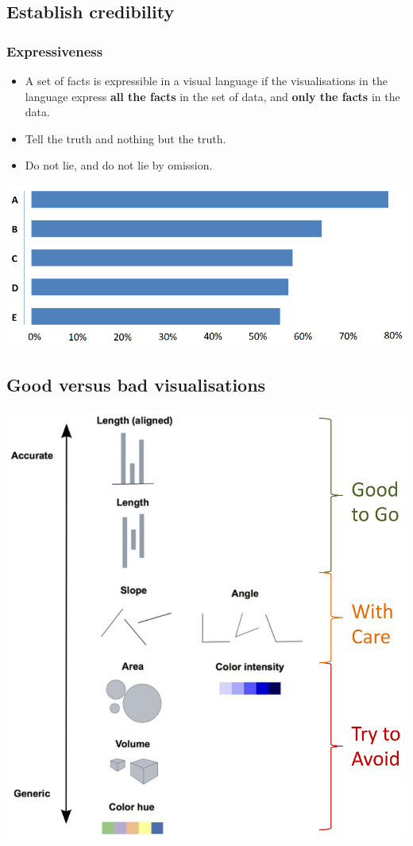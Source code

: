 \documentclass[11pt]{article}
\begin{document}
\subsection{Establish credibility}
\label{sec:org16a9743}

\subsubsection{Expressiveness}
\label{sec:org6d1a516}
\begin{itemize}
\item A set of facts is expressible in a visual language if the visualisations in the language express \textbf{all the facts} in the set of data, and \textbf{only the facts} in the data.
\item Tell the truth and nothing but the truth.
\item Do not lie, and do not lie by omission.
\end{itemize}

\begin{center}
\includegraphics[width=.9\linewidth]{./images/data-visualisation-expressiveness-example-diagram.png}
\end{center}
\subsection{Good versus bad visualisations}
\label{sec:org223f764}
\begin{center}
\includegraphics[width=.9\linewidth]{./images/good-vs-bad-visualisations.png}
\end{center}
\end{document}
